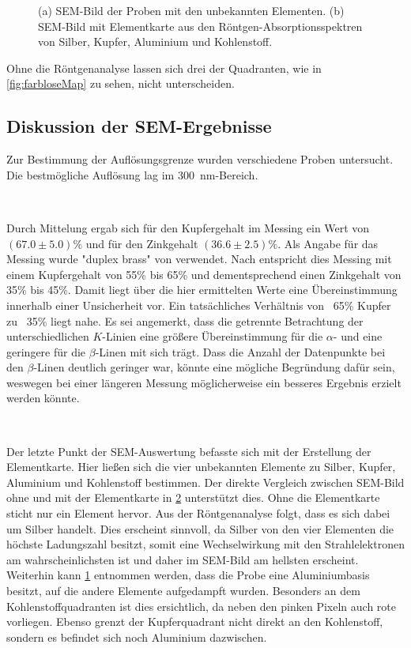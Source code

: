 \begin{figure}[H]
\begin{subfigure}[c]{.45\textwidth}
			\subcaption{}
			\label{fig:bunteMap}
		\end{subfigure}
		\caption{(a) SEM-Bild der Proben mit den unbekannten Elementen.
		(b) SEM-Bild mit Elementkarte aus den Röntgen-Absorptionsspektren von Silber, Kupfer, Aluminium und Kohlenstoff.}
		\label{fig:elementalMap}
	\end{figure}
	Ohne die Röntgenanalyse lassen sich drei der Quadranten, wie in \cref{fig:farbloseMap} zu sehen, nicht unterscheiden.

\subsection{Diskussion der SEM-Ergebnisse}

	Zur Bestimmung der Auflösungsgrenze wurden verschiedene Proben untersucht.
	Die bestmögliche Auflösung lag im \SI{300}{\nano\meter}-Bereich.

	\

	Durch Mittelung ergab sich für den Kupfergehalt im Messing ein Wert von $(67.0\pm5.0)\%$ und für den Zinkgehalt $(36.6\pm2.5)\%$.
	Als Angabe für das Messing wurde "duplex brass" von \cite{wwu} verwendet.
	Nach \cite{wikiMs} entspricht dies Messing mit einem Kupfergehalt von 55\% bis 65\% und dementsprechend einen Zinkgehalt von 35\% bis 45\%.
	Damit liegt über die hier ermittelten Werte eine Übereinstimmung innerhalb einer Unsicherheit vor.
	Ein tatsächliches Verhältnis von ~65\% Kupfer zu ~35\% liegt nahe.
	Es sei angemerkt, dass die getrennte Betrachtung der unterschiedlichen $K$-Linien eine größere Übereinstimmung für die $\alpha$- und eine geringere für die $\beta$-Linen mit sich trägt.
	Dass die Anzahl der Datenpunkte bei den $\beta$-Linen deutlich geringer war, könnte eine mögliche Begründung dafür sein, weswegen bei einer längeren Messung möglicherweise ein besseres Ergebnis erzielt werden könnte.

	\

	Der letzte Punkt der SEM-Auswertung befasste sich mit der Erstellung der Elementkarte.
	Hier ließen sich die vier unbekannten Elemente zu Silber, Kupfer, Aluminium und Kohlenstoff bestimmen.
	Der direkte Vergleich zwischen SEM-Bild ohne und mit der Elementkarte in \cref{fig:elementalMap} unterstützt dies.
	Ohne die Elementkarte sticht nur ein Element hervor.
	Aus der Röntgenanalyse folgt, dass es sich dabei um Silber handelt.
	Dies erscheint sinnvoll, da Silber von den vier Elementen die höchste Ladungszahl besitzt, somit eine Wechselwirkung mit den Strahlelektronen am wahrscheinlichsten ist und daher im SEM-Bild am hellsten erscheint.
	Weiterhin kann \cref{fig:bunteMap} entnommen werden, dass die Probe eine Aluminiumbasis besitzt, auf die andere Elemente aufgedampft wurden.
	Besonders an dem Kohlenstoffquadranten ist dies ersichtlich, da neben den pinken Pixeln auch rote vorliegen.
	Ebenso grenzt der Kupferquadrant nicht direkt an den Kohlenstoff, sondern es befindet sich noch Aluminium dazwischen.

